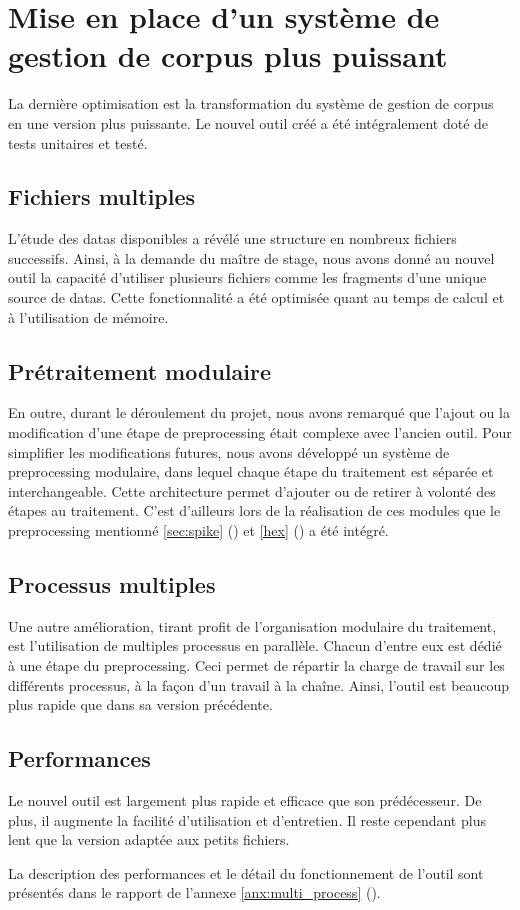\section{Mise en place d'un système de gestion de corpus plus puissant}\label{sec:papud_mulitiqueue}
La dernière optimisation est la transformation du système de gestion de corpus en une version plus puissante. Le nouvel outil créé a été intégralement doté de tests unitaires et testé.

\subsection{Fichiers multiples}
L'étude des \glspl{data} disponibles a révélé une structure en nombreux fichiers successifs.
Ainsi, à la demande du maître de stage, nous avons donné au nouvel outil la capacité d'utiliser plusieurs fichiers comme les fragments d'une unique source de \glspl{data}.
Cette fonctionnalité a été optimisée quant au temps de calcul et à l'utilisation de mémoire.

\subsection{Prétraitement modulaire}
En outre, durant le déroulement du projet, nous avons remarqué que l'ajout ou la modification d'une étape de \gls{preprocessing} était complexe avec l'ancien outil.
Pour simplifier les modifications futures, nous avons développé un système de \gls{preprocessing} modulaire, dans lequel chaque étape du traitement est séparée et interchangeable.
Cette architecture permet d'ajouter ou de retirer à volonté des étapes au traitement.
C'est d'ailleurs lors de la réalisation de ces modules que le \gls{preprocessing} mentionné \autoref{sec:spike} () et \autoref{hex} () a été intégré.

\subsection{Processus multiples}
Une autre amélioration, tirant profit de l'organisation modulaire du traitement, est l'utilisation de multiples processus en parallèle.
Chacun d'entre eux est dédié à une étape du \gls{preprocessing}.
Ceci permet de répartir la charge de travail sur les différents processus, à la façon d'un travail à la chaîne.
Ainsi, l'outil est beaucoup plus rapide que dans sa version précédente.

\subsection{Performances}
Le nouvel outil est largement plus rapide et efficace que son prédécesseur.
De plus, il augmente la facilité d'utilisation et d'entretien.
Il reste cependant plus lent que la version adaptée aux petits fichiers.

La description des performances et le détail du fonctionnement de l'outil sont présentés dans le rapport de l'annexe \ref{anx:multi_process} ().
\pagebreak